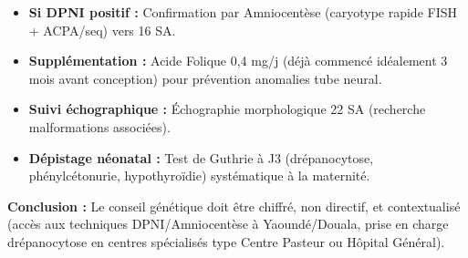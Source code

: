 \documentclass[11pt]{article}
\begin{document}
\begin{exoresolu}
\begin{enumerate}
\begin{itemize}
            \item \textbf{Si DPNI positif :} Confirmation par Amniocentèse (caryotype rapide FISH + ACPA/seq) vers 16 SA.
            \item \textbf{Supplémentation :} Acide Folique 0,4 mg/j (déjà commencé idéalement 3 mois avant conception) pour prévention anomalies tube neural.
            \item \textbf{Suivi échographique :} Échographie morphologique 22 SA (recherche malformations associées).
            \item \textbf{Dépistage néonatal :} Test de Guthrie à J3 (drépanocytose, phénylcétonurie, hypothyroïdie) systématique à la maternité.
        \end{itemize}
    \end{enumerate}
    \textbf{Conclusion :} Le conseil génétique doit être chiffré, non directif, et contextualisé (accès aux techniques DPNI/Amniocentèse à Yaoundé/Douala, prise en charge drépanocytose en centres spécialisés type Centre Pasteur ou Hôpital Général).
\end{exoresolu}
\end{document}
